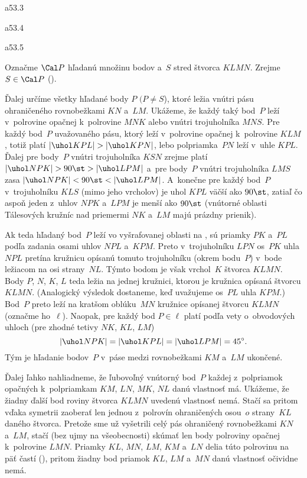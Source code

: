 {%
\epsplace a53.3 \hfil\Obr\par
\epsplace a53.4 \hfil\Obr\par
\epsplace a53.5 \hfil\Obr\par
Označme $\Cal P$ hľadanú množinu bodov a~$S$ stred štvorca $KLMN$.
Zrejme $S\in \Cal P$ (\obr).

Ďalej určíme všetky hľadané body $P$ $(P\ne S$), ktoré ležia
vnútri pásu ohraničeného rovnobežkami $KN$ a~$LM$. Ukážeme, že každý
taký bod~$P$ leží v~polrovine opačnej k~polrovine $MNK$ alebo vnútri trojuholníka $MNS$.
Pre každý bod~$P$ uvažovaného pásu, ktorý leží v~polrovine opačnej
k~polrovine $KLM$, totiž platí $|\uhol KPL|>|\uhol KPN|$,
lebo polpriamka~$PN$ leží v~uhle $KPL$. 
Ďalej pre body~$P$ vnútri trojuholníka $KSN$ zrejme platí $|\uhol NPK|>90\st>|\uhol LPM|$ a~pre 
body~$P$ vnútri trojuholníka $LMS$ zasa $|\uhol NPK|<90\st<|\uhol LPM|$.
A~konečne pre každý bod~$P$ v~trojuholníku $KLS$ (mimo jeho vrcholov) je uhol $KPL$ väčší ako $90\st$, zatiaľ čo
aspoň jeden z~uhlov $NPK$ a~$LPM$ je menší ako $90\st$ (vnútorné oblasti Tálesových kružníc nad priemermi $NK$
a~$LM$ majú prázdny prienik).
\inspicture{}

Ak teda hľadaný bod~$P$ leží vo vyšrafovanej oblasti na ,
sú priamky $PK$ a~$PL$ podľa zadania osami uhlov $NPL$ 
a~$KPM$. Preto v~trojuholníku $LPN$ os~$PK$ uhla $NPL$
pretína kružnicu opísanú tomuto trojuholníku (okrem bodu~$P$) 
v~bode ležiacom na osi strany~$NL$. Týmto bodom je však
vrchol~$K$ štvorca $KLMN$. Body $P$, $N$, $K$, $L$ teda ležia
na jednej kružnici, ktorou je kružnica opísaná štvorcu $KLMN$.
(Analogický výsledok dostaneme, keď uvažujeme os~$PL$ uhla $KPM$.)
Bod~$P$ preto leží na kratšom oblúku~$MN$ kružnice
opísanej štvorcu $KLMN$ (označme ho~$\ell$).
Naopak, pre každý bod $P\in\ell$ platí podľa vety
o~obvodových uhloch (pre zhodné tetivy $NK$, $KL$, $LM$)
$$
|\uhol NPK|=|\uhol KPL|=|\uhol LPM|=45^{\circ}.
$$
Tým je hľadanie bodov~$P$ v~páse medzi rovnobežkami $KM$ a~$LM$
ukončené.

Ďalej ľahko nahliadneme, že ľubovoľný vnútorný bod~$P$ každej
z~polpriamok opačných k~polpriamkam $KM$, $LN$, $MK$, $NL$ danú
vlastnosť má. Ukážeme, že žiadny ďalší bod roviny štvorca
$KLMN$ uvedenú vlastnosť nemá. Stačí sa pritom vďaka symetrii
zaoberať len jednou z~polrovín ohraničených osou~$o$ strany~$KL$ daného
štvorca. Pretože sme už vyšetrili celý pás ohraničený rovnobežkami
$KN$ a~$LM$, stačí (bez ujmy na všeobecnosti) skúmať len body
polroviny opačnej k~polrovine $LMN$. Priamky $KL$, $MN$, $LM$,
$KM$ a~$LN$ delia túto polrovinu na päť častí (\obr), pritom
žiadny bod priamok $KL$, $LM$ a~$MN$ danú vlastnosť očividne nemá.
\inspicture{}

}
